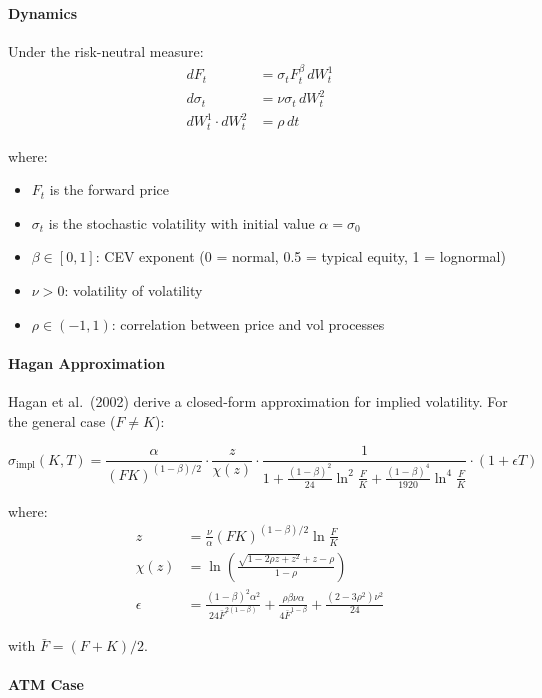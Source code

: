 \paragraph{Dynamics}

Under the risk-neutral measure:
\begin{align*}
dF_t &= \sigma_t F_t^\beta \, dW_t^1 \\
d\sigma_t &= \nu \sigma_t \, dW_t^2 \\
dW_t^1 \cdot dW_t^2 &= \rho \, dt
\end{align*}

where:
\begin{itemize}
  \item $F_t$ is the forward price
  \item $\sigma_t$ is the stochastic volatility with initial value $\alpha = \sigma_0$
  \item $\beta \in [0, 1]$: CEV exponent (0 = normal, 0.5 = typical equity, 1 = lognormal)
  \item $\nu > 0$: volatility of volatility
  \item $\rho \in (-1, 1)$: correlation between price and vol processes
\end{itemize}

\paragraph{Hagan Approximation}

Hagan et al.~(2002) derive a closed-form approximation for implied volatility. For the general case ($F \neq K$):

\[
\sigma_{\text{impl}}(K, T) = \frac{\alpha}{(FK)^{(1-\beta)/2}} \cdot \frac{z}{\chi(z)} \cdot \frac{1}{1 + \frac{(1-\beta)^2}{24} \ln^2\!\frac{F}{K} + \frac{(1-\beta)^4}{1920} \ln^4\!\frac{F}{K}} \cdot \left(1 + \epsilon T\right)
\]

where:
\begin{align*}
z &= \frac{\nu}{\alpha} (FK)^{(1-\beta)/2} \ln\frac{F}{K} \\
\chi(z) &= \ln\!\left(\frac{\sqrt{1 - 2\rho z + z^2} + z - \rho}{1 - \rho}\right) \\
\epsilon &= \frac{(1-\beta)^2 \alpha^2}{24 \bar{F}^{2(1-\beta)}} + \frac{\rho \beta \nu \alpha}{4 \bar{F}^{1-\beta}} + \frac{(2 - 3\rho^2)\nu^2}{24}
\end{align*}

with $\bar{F} = (F + K) / 2$.

\paragraph{ATM Case}

